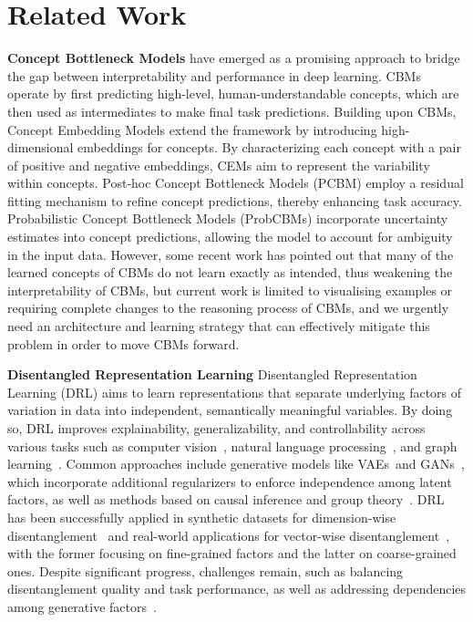 \section{Related Work}
\textbf{Concept Bottleneck Models} \cite{koh2020concept, kim2023probabilistic, yuksekgonul2022post} have emerged as a promising approach to bridge the gap between interpretability and performance in deep learning. CBMs operate by first predicting high-level, human-understandable concepts, which are then used as intermediates to make final task predictions. 
Building upon CBMs, Concept Embedding Models \cite{zarlenga2022concept} extend the framework by introducing high-dimensional embeddings for concepts. By characterizing each concept with a pair of positive and negative embeddings, CEMs aim to represent the variability within concepts. Post-hoc Concept Bottleneck Models (PCBM) \cite{yuksekgonul2022post} employ a residual fitting mechanism to refine concept predictions, thereby enhancing task accuracy. Probabilistic Concept Bottleneck Models (ProbCBMs) \cite{kim2023probabilistic} incorporate uncertainty estimates into concept predictions, allowing the model to account for ambiguity in the input data. However, some recent work \cite{margeloiu2021concept} has pointed out that many of the learned concepts of CBMs do not learn exactly as intended, thus weakening the interpretability of CBMs, but current work is limited to visualising examples or requiring complete changes to the reasoning process of CBMs, and we urgently need an architecture and learning strategy that can effectively mitigate this problem in order to move CBMs forward.

\textbf{Disentangled Representation Learning} Disentangled Representation Learning (DRL) aims to learn representations that separate underlying factors of variation in data into independent, semantically meaningful variables. By doing so, DRL improves explainability, generalizability, and controllability across various tasks such as computer vision~\cite{cheng2023disentangled}, natural language processing~\cite{wu2020improving}, and graph learning~\cite{wang2024disentangling}. Common approaches include generative models like VAEs~\cite{xu2021multi}and GANs~\cite{liu2020oogan,tran2017disentangled}, which incorporate additional regularizers to enforce independence among latent factors, as well as methods based on causal inference and group theory~\cite{bengio2013representation, higgins2018towards}. DRL has been successfully applied in synthetic datasets for dimension-wise disentanglement~\cite{chen2016infogan,jeon2021ib} and real-world applications for vector-wise disentanglement~\cite{liu2021activity,cheng2023disentangled}, with the former focusing on fine-grained factors and the latter on coarse-grained ones. Despite significant progress, challenges remain, such as balancing disentanglement quality and task performance, as well as addressing dependencies among generative factors~\cite{suter2019robustly}.